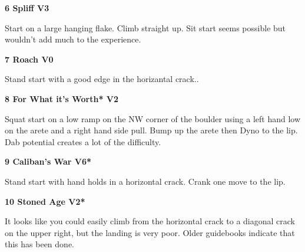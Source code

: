 \begin{multicols}{2}
			


			\needspace{1.5cm}
\label{rt:Spliff}
\colorbox{green!20}{
\parbox{0.95\linewidth}{
\textbf{
6 Spliff V3  \warn
}}}

			\begin{adjustwidth}{0.5cm}{}			
			Start on a large hanging flake. Climb straight up. Sit start seems possible but wouldn't add much to the experience.
			\end{adjustwidth}
			
			
			
			\needspace{1.5cm}
\label{rt:Roach}
\colorbox{green!20}{
\parbox{0.95\linewidth}{
\textbf{
7 Roach V0  
}}}

			\begin{adjustwidth}{0.5cm}{}			
			Stand start with a good edge in the horizantal crack..
			\end{adjustwidth}
			
			
			
			\needspace{1.5cm}
\label{rt:For What it's Worth}
\colorbox{green!20}{
\parbox{0.95\linewidth}{
\textbf{
8 For What it's Worth* V2  
}}}

			\begin{adjustwidth}{0.5cm}{}			
			Squat start on a low ramp on the NW corner of the boulder using a left hand low on the arete and a right hand side pull. Bump up the arete then Dyno to the lip. Dab potential creates a lot of the difficulty.
			\end{adjustwidth}
			
			


			\needspace{1.5cm}
\label{rt:Caliban's War}
\colorbox{RoyalBlue!20}{
\parbox{0.95\linewidth}{
\textbf{
9 Caliban's War V6*  
}}}

			\begin{adjustwidth}{0.5cm}{}			
			Stand start with hand holds in a horizontal crack. Crank one move to the lip.
			\end{adjustwidth}
			
			
			
			\needspace{1.5cm}
\label{rt:Stoned Age}
\colorbox{green!20}{
\parbox{0.95\linewidth}{
\textbf{
10 Stoned Age V2*  
}}}

			\begin{adjustwidth}{0.5cm}{}			
			It looks like you could easily climb from the horizontal crack to a diagonal crack on the upper right, but the landing is very poor. Older guidebooks indicate that this has been done.
			\end{adjustwidth}
			
			
		
	

\end{multicols}
\clearpage